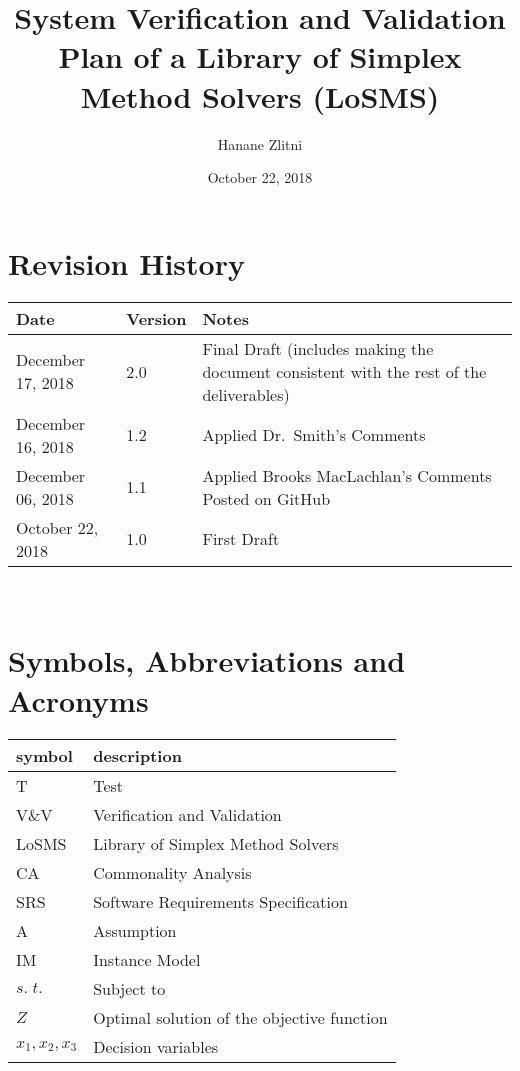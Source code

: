\documentclass[12pt, titlepage]{article}
\newcommand{\famname}{LoSMS}
\begin{document}
\title{System Verification and Validation Plan of a Library of Simplex Method 
Solvers (\famname{}) }
\author{Hanane Zlitni}
\date{October 22, 2018}
	
\maketitle


\section{Revision History}

\begin{tabularx}{\textwidth}{p{3cm}p{2cm}X}
\toprule {\bf Date} & {\bf Version} & {\bf Notes}\\
\midrule
December 17, 2018 & 2.0 & Final Draft (includes making the document consistent 
with the rest of the deliverables)\\
December 16, 2018 & 1.2 & Applied Dr.~Smith’s Comments\\
December 06, 2018 & 1.1 & Applied Brooks MacLachlan’s Comments Posted on 
GitHub\\
October 22, 2018 & 1.0 & First Draft\\
\bottomrule
\end{tabularx}

~\newpage

\section{Symbols, Abbreviations and Acronyms}

\renewcommand{\arraystretch}{1.2}
\begin{tabular}{l l} 
  \toprule		
  \textbf{symbol} & \textbf{description}\\
  \midrule 
  T & Test\\
  V\&V & Verification and Validation\\
  \famname{} & Library of Simplex Method Solvers\\
  CA & Commonality Analysis\\
  SRS & Software Requirements Specification\\
  A & Assumption\\
  IM & Instance Model\\
  $s.\;t.$ & Subject to\\
  $Z$ & Optimal solution of the objective function\\
  $x_1, x_2, x_3$ & Decision variables\\
  \bottomrule
\end{tabular}\\
\end{document}
